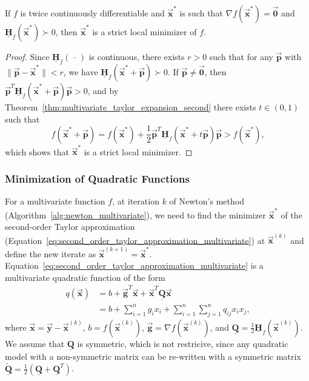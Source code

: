 \documentclass[9pt, headings=standardclasses, parskip=half]{scrartcl}
\newcommand{\matr}[1]{\underline{\boldsymbol{#1}}}
\newcommand{\vect}[1]{\vec{\boldsymbol{#1}}}
\begin{document}
\begin{theorem}\label{thm:sufficient_optimality_conditions_multivariate}
If \(f\) is twice continuously differentiable and \(\vect{x}^{*}\) is such that \(\nabla f(\vect{x}^{*})=\vect{0}\) and \(\matr{H}_{f}(\vect{x}^{*})\succ 0\), then \(\vect{x}^{*}\) is a strict local minimizer of \(f\).
\end{theorem}
\begin{proof}
Since \(\matr{H}_{f}(\, \cdot \,)\) is continuous, there exists \(r>0\) such that for any \(\vect{p}\) with \(\|\vect{p} - \vect{x}^{*}\| < r\), we have \(\matr{H}_{f}(\vect{x}^{*}+\vect{p}) \succ 0\). 
If \(\vect{p} \neq \vect{0}\), then \(\vect{p}^{T}\matr{H}_{f}(\vect{x}^{*}+\vect{p})\vect{p} > 0\), and by Theorem~\ref{thm:multivariate_taylor_expansion_second} there exists \(t \in (0,1)\) such that
\[
f(\vect{x}^{*}+\vect{p})=f(\vect{x}^{*})+\frac{1}{2}\vect{p}^{T}\matr{H}_{f}(\vect{x}^{*}+t\vect{p})\vect{p} > f(\vect{x}^{*}) \text{,}
\]
which shows that \(\vect{x}^{*}\) is a strict local minimizer.
\end{proof}

\subsubsection{Minimization of Quadratic Functions}
\label{subsubsec:quadratic_minimization}
For a multivariate function \(f\), at iteration \(k\) of Newton's method (Algorithm~\ref{alg:newton_multivariate}), we need to find the minimizer \(\vect{x}^{*}\) of the second-order Taylor approximation (Equation~\ref{eq:second_order_taylor_approximation_multivariate}) at \(\vect{x}^{(k)}\) and define the new iterate as \(\vect{x}^{(k+1)} = \vect{x}^{*}\).
Equation~\ref{eq:second_order_taylor_approximation_multivariate} is a multivariate quadratic function of the form
\begin{align}
q(\vect{x}) &= b + \vect{g}^{T}\vect{x} + \vect{x}^{T}\matr{Q}\vect{x} \label{eq:multivariate_quadratic_function} \\
&= b + \sum_{i=1}^{n}g_{i}x_{i} + \sum_{i=1}^{n}\sum_{j=1}^{n}q_{ij}x_{i}x_{j} \text{,} \label{eq:multivariate_quadratic_function_expanded}
\end{align}
where \(\vect{x} = \vect{y} - \vect{x}^{(k)}\), \(b = f(\vect{x}^{(k)})\), \(\vect{g} = \nabla f(\vect{x}^{(k)})\), and \(\matr{Q} = \frac{1}{2}\matr{H}_{f}(\vect{x}^{(k)})\).
We assume that \(\matr{Q}\) is symmetric, which is not restricive, since any quadratic model with a non-symmetric matrix can be re-written with a symmetric matrix \(\tilde{\matr{Q}} = \frac{1}{2}(\matr{Q}+\matr{Q}^{T})\).
\end{document}
